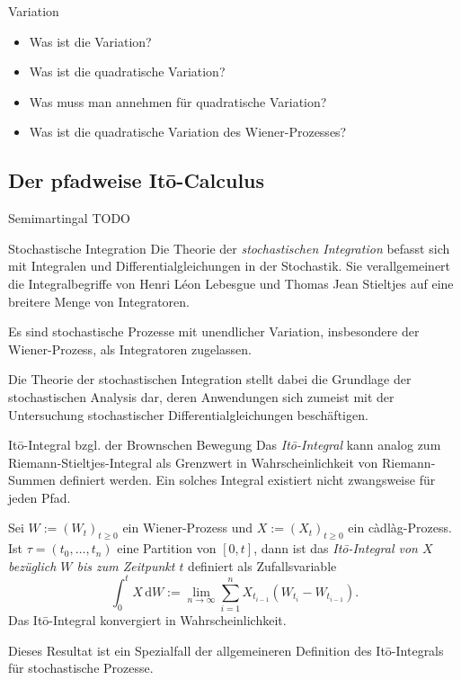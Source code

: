 \begin{info}{Variation}
    \begin{itemize}
        \item Was ist die Variation?
        \item Was ist die quadratische Variation?
        \item Was muss man annehmen für quadratische Variation?
        \item Was ist die quadratische Variation des Wiener-Prozesses?
    \end{itemize}
\end{info}

\subsection{Der pfadweise Itō-Calculus}

\begin{defi}[Martingal]{Semimartingal}
    TODO
\end{defi}

\begin{bonus}{Stochastische Integration}
    Die Theorie der \emph{stochastischen Integration} befasst sich mit Integralen und Differentialgleichungen in der Stochastik.
    Sie verallgemeinert die Integralbegriffe von Henri Léon Lebesgue und Thomas Jean Stieltjes auf eine breitere Menge von Integratoren.

    Es sind stochastische Prozesse mit unendlicher Variation, insbesondere der Wiener-Prozess, als Integratoren zugelassen.

    Die Theorie der stochastischen Integration stellt dabei die Grundlage der stochastischen Analysis dar, deren Anwendungen sich zumeist mit der Untersuchung stochastischer Differentialgleichungen beschäftigen.
\end{bonus}

\begin{defi}{Itō-Integral bzgl. der Brownschen Bewegung}
    Das \emph{Itō-Integral} kann analog zum Riemann-Stieltjes-Integral als Grenzwert in Wahrscheinlichkeit von Riemann-Summen definiert werden.
    Ein solches Integral existiert nicht zwangsweise für jeden Pfad.

    Sei $W:= (W_{t})_{t\geq 0}$ ein Wiener-Prozess und $X := (X_{t})_{t\geq 0}$ ein càdlàg-Prozess.
    Ist $\tau = (t_{0},\dots ,t_{n})$ eine Partition von $[0,t]$, dann ist das \emph{Itō-Integral von $X$ bezüglich $W$ bis zum Zeitpunkt $t$} definiert als Zufallsvariable
    \[
        \int_{0}^{t} X \, \mathrm{d}W := \lim_{n\to \infty } \sum_{i=1}^{n} X_{t_{i-1}}(W_{t_{i}}-W_{t_{i-1}}).
    \]
    Das Itō-Integral konvergiert in Wahrscheinlichkeit.

    Dieses Resultat ist ein Spezialfall der allgemeineren Definition des Itō-Integrals für stochastische Prozesse.
\end{defi}

